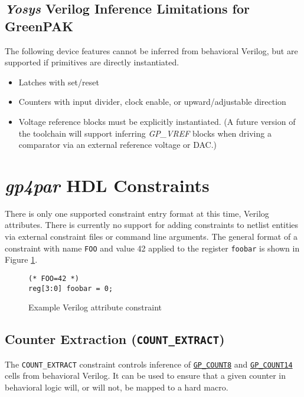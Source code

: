 \documentclass[11pt]{article}
\newcommand{\namestyle}[1]{\textit{#1}}
\newcommand{\tokenstyle}[1]{\texttt{#1}}
\newcommand{\wirestyle}[1]{\texttt{#1}}
\newcommand{\tokenref}[2]{\hyperref[#2]{\tokenstyle{#1}}}
\begin{document}
\subsection{\namestyle{Yosys} Verilog Inference Limitations for GreenPAK}

The following device features cannot be inferred from behavioral Verilog, but are supported if primitives are directly
instantiated.

\begin{itemize}
\item Latches with set/reset
\item Counters with input divider, clock enable, or upward/adjustable direction
\item Voltage reference blocks must be explicitly instantiated. (A future version of the toolchain will support inferring
\namestyle{GP\_VREF} blocks when driving a comparator via an external reference voltage or DAC.)
\end{itemize}

\pagebreak
\section{\namestyle{gp4par} HDL Constraints}

There is only one supported constraint entry format at this time, Verilog attributes. There is currently no support for
adding constraints to netlist entities via external constraint files or command line arguments. The general format of a
constraint with name \tokenstyle{FOO} and value 42 applied to the register \wirestyle{foobar} is shown in Figure
\ref{constraint}.

\begin{figure}[h]
\begin{lstlisting}
(* FOO=42 *)
reg[3:0] foobar = 0;
\end{lstlisting}
\caption{Example Verilog attribute constraint}
\label{constraint}
\end{figure}


\pagebreak
\subsection{Counter Extraction (\tokenstyle{COUNT\_EXTRACT})}
\label{count-extract}

The \tokenstyle{COUNT\_EXTRACT} constraint controls inference of \tokenref{GP\_COUNT8}{gp-count8} and \tokenref{GP\_COUNT14}{gp-count14} cells from behavioral Verilog. It can be
used to ensure that a given counter in behavioral logic will, or will not, be mapped to a hard macro.
\end{document}
